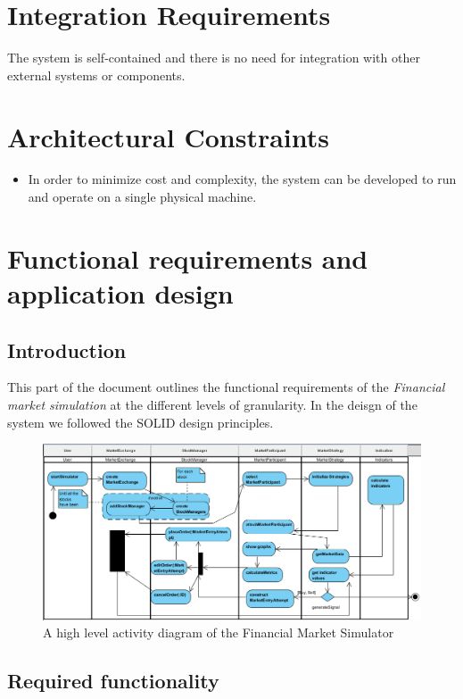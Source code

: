 \documentclass[12pt]{article}
\begin{document}
		\section{Integration Requirements}
		The system is self-contained and there is no need for integration with other external systems or components.
		\section{Architectural Constraints}
		\begin{itemize}
		\item In order to minimize cost and complexity, the system can be developed to run and operate on a single physical machine. 
		\end{itemize}
	
	\newpage		    		    		    			    	
	\section{Functional requirements and application design}
		\subsection{Introduction}	
		This part of the document outlines the functional requirements of the \textit{Financial market simulation} at the different levels of granularity. In the deisgn of the system we followed the SOLID design principles.
		
			\begin{figure}[th]
			\centering
			\includegraphics[scale=0.6]{./activity}
			\caption{A high level activity diagram of the Financial Market Simulator}
			\label{domain objects}
			\end{figure}
		\pagebreak			    
		\subsection{Required functionality}	
\end{document}
